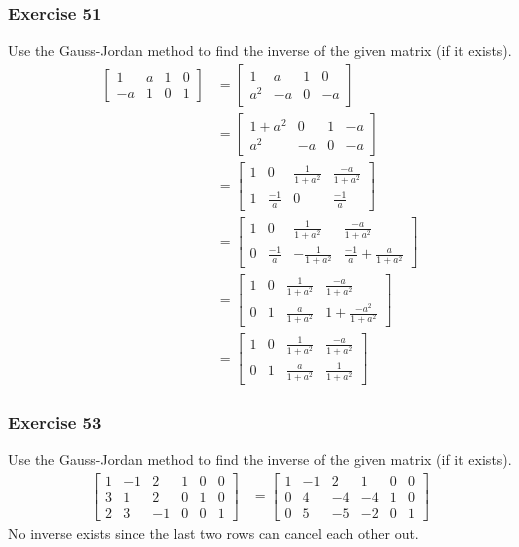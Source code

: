 \documentclass{math}
\begin{document}
\subsubsection*{Exercise 51}
Use the Gauss-Jordan method to find the inverse of the given matrix (if it
exists).
\begin{align*}
  \begin{bmatrix}
    1 & a & 1 & 0 \\
    -a & 1 & 0 & 1
  \end{bmatrix} &= \begin{bmatrix}
    1 & a & 1 & 0 \\
    a^2 & -a & 0 & -a
  \end{bmatrix} \\
  &= \begin{bmatrix}
    1+a^2 & 0 & 1 & -a \\
    a^2 & -a & 0 & -a
  \end{bmatrix} \\
  &= \begin{bmatrix}
    1 & 0 & \frac{1}{1+a^2} & \frac{-a}{1+a^2} \\[0.25em]
    1 & \frac{-1}{a} & 0 & \frac{-1}{a}
  \end{bmatrix} \\
  &= \begin{bmatrix}
    1 & 0 & \frac{1}{1+a^2} & \frac{-a}{1+a^2} \\[0.25em]
    0 & \frac{-1}{a} & -\frac{1}{1+a^2} & \frac{-1}{a}+\frac{a}{1+a^2}
  \end{bmatrix} \\
  &= \begin{bmatrix}
    1 & 0 & \frac{1}{1+a^2} & \frac{-a}{1+a^2} \\[0.25em]
    0 & 1 & \frac{a}{1+a^2} & 1+\frac{-a^2}{1+a^2}
  \end{bmatrix} \\
  &= \begin{bmatrix}
    1 & 0 & \frac{1}{1+a^2} & \frac{-a}{1+a^2} \\[0.25em]
    0 & 1 & \frac{a}{1+a^2} & \frac{1}{1+a^2}
  \end{bmatrix}
\end{align*}

\subsubsection*{Exercise 53}
Use the Gauss-Jordan method to find the inverse of the given matrix (if it
exists).
\begin{align*}
  \begin{bmatrix}
    1 & -1 & 2 & 1 & 0 & 0 \\
    3 & 1 & 2 & 0 & 1 & 0 \\
    2 & 3 & -1 & 0 & 0 & 1
  \end{bmatrix} &= \begin{bmatrix}
    1 & -1 & 2 & 1 & 0 & 0 \\
    0 & 4 & -4 & -4 & 1 & 0 \\
    0 & 5 & -5 & -2 & 0 & 1
  \end{bmatrix}
\end{align*}
No inverse exists since the last two rows can cancel each other out.
\end{document}
